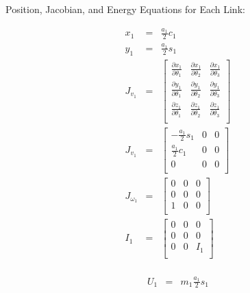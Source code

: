 \documentclass[a4paper]{article}
\begin{document}
\clearpage

\noindent Position, Jacobian, and Energy Equations for Each Link:

\begin{eqnarray*}
x_1 & = & \frac{a_1}{2}c_1\\
y_1 & = & \frac{a_1}{2}s_1\\
J_{v_1} & = & \begin{bmatrix}
			  \frac{\partial x_1}{\partial \theta_1} & \frac{\partial x_1}{\partial \theta_2} & \frac{\partial x_1}{\partial \theta_3} \\
              \frac{\partial y_1}{\partial \theta_1} & \frac{\partial y_1}{\partial \theta_2} & \frac{\partial y_1}{\partial \theta_3} \\
              \frac{\partial z_1}{\partial \theta_1} & \frac{\partial z_1}{\partial \theta_2} & \frac{\partial z_1}{\partial \theta_3} \\
			  \end{bmatrix}\\
J_{v_1} & = & \begin{bmatrix}
			  -\frac{a_1}{2}s_1 & 0 & 0\\
              \frac{a_1}{2}c_1 & 0 & 0\\
              0 & 0 & 0\\
			  \end{bmatrix}\\  
J_{\omega_1} & = & \begin{bmatrix}
			  0 & 0 & 0\\
              0 & 0 & 0\\
              1 & 0 & 0\\
			  \end{bmatrix}\\
I_1 & = & \begin{bmatrix}
		  0 & 0 & 0\\
          0 & 0 & 0\\
          0 & 0 & I_1\\
	      \end{bmatrix}\\
\end{eqnarray*}

\begin{eqnarray*}
U_1 & = & m_1 \frac{a_1}{2}s_{1}\\
\end{eqnarray*}
\end{document}
